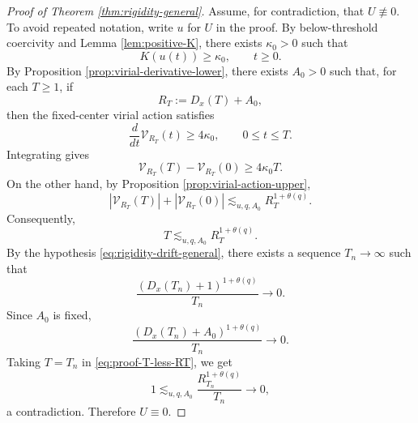 \documentclass[10pt,a4paper]{amsart}
\numberwithin{equation}{section}
\newcommand{\Vc}{\mathcal V}
\begin{document}
\begin{proof}[Proof of Theorem \ref{thm:rigidity-general}]
Assume, for contradiction, that $U\not\equiv0$. To avoid repeated notation, write $u$ for $U$ in the proof. By below-threshold coercivity and Lemma \ref{lem:positive-K}, there exists $\kappa_0>0$ such that
\begin{equation*}
  K(u(t))\ge\kappa_0,
  \qquad t\ge0.
\end{equation*}
By Proposition \ref{prop:virial-derivative-lower}, there exists $A_0>0$ such that, for each $T\ge1$, if
\begin{equation*}
  R_T:=D_x(T)+A_0,
\end{equation*}
then the fixed-center virial action satisfies
\begin{equation*}
  \frac{d}{dt}\Vc_{R_T}(t)\ge4\kappa_0,
  \qquad 0\le t\le T.
\end{equation*}
Integrating gives
\begin{equation*}
  \Vc_{R_T}(T)-\Vc_{R_T}(0)\ge4\kappa_0T.
\end{equation*}
On the other hand, by Proposition \ref{prop:virial-action-upper},
\begin{equation*}
  |\Vc_{R_T}(T)|+|\Vc_{R_T}(0)|
  \lesssim_{u,q,A_0} R_T^{1+\theta(q)}.
\end{equation*}
Consequently,
\begin{equation}\label{eq:proof-T-less-RT}
  T\lesssim_{u,q,A_0} R_T^{1+\theta(q)}.
\end{equation}
By the hypothesis \eqref{eq:rigidity-drift-general}, there exists a sequence $T_n\to\infty$ such that
\begin{equation*}
  \frac{(D_x(T_n)+1)^{1+\theta(q)}}{T_n}\to0.
\end{equation*}
Since $A_0$ is fixed,
\begin{equation*}
  \frac{(D_x(T_n)+A_0)^{1+\theta(q)}}{T_n}\to0.
\end{equation*}
Taking $T=T_n$ in \eqref{eq:proof-T-less-RT}, we get
\begin{equation*}
  1\lesssim_{u,q,A_0}
  \frac{R_{T_n}^{1+\theta(q)}}{T_n}\to0,
\end{equation*}
a contradiction. Therefore $U\equiv0$.
\end{proof}
\end{document}
